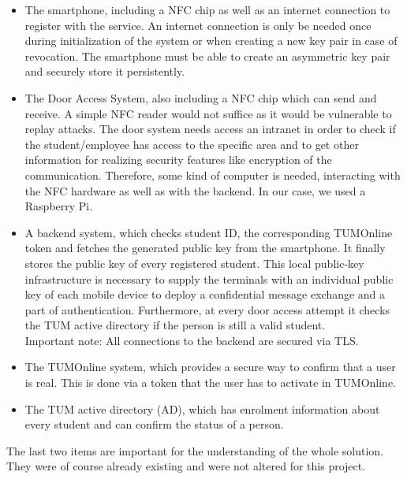 \begin{itemize}
\item The smartphone, including a NFC chip as well as an internet connection to register with the service.
An internet connection is only be needed once during initialization of the system or when creating a new key pair in case of revocation.
The smartphone must be able to create an asymmetric key pair and securely store it persistently.
\item The Door Access System, also including a NFC chip which can send and receive.
A simple NFC reader would not suffice as it would be vulnerable to replay attacks.
The door system needs access an intranet in order to check if the student/employee has access to the specific area and to get other information for realizing security features like encryption of the communication.
Therefore, some kind of computer is needed, interacting with the NFC hardware as well as with the backend. In our case, we used a Raspberry Pi.
\item A backend system, which checks student ID, the corresponding TUMOnline token and fetches the generated public key from the smartphone.
It finally stores the public key of every registered student.
This local public-key infrastructure is necessary to supply the terminals with an individual public key of each mobile device to deploy a confidential message exchange and a part of authentication.
Furthermore, at every door access attempt it checks the TUM active directory if the person is still a valid student.\\
Important note: All connections to the backend are secured via TLS.
\item The TUMOnline system, which provides a secure way to confirm that a user is real.
This is done via a token that the user has to activate in TUMOnline.
\item The TUM active directory (AD), which has enrolment information about every student and can confirm the status of a person.
\end{itemize} 
The last two items are important for the understanding of the whole solution. They were of course already existing and were not altered for this project.

\bigskip




